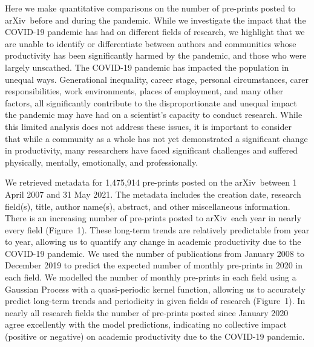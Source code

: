 \documentclass[a4paper,12pt]{article}
\newcommand{\arxiv}{arXiv}
\begin{document}
Here we make quantitative comparisons on the number of pre-prints posted to \arxiv\ before and during the pandemic. While we investigate the impact that the COVID-19 pandemic has had on different fields of research, we highlight that we are unable to identify or differentiate between authors and communities whose productivity has been significantly harmed by the pandemic, and those who were largely unscathed. The COVID-19 pandemic has impacted the population in unequal ways\cite{Nicola:2020,Chu:2020,IbnMohammed:2021}. Generational inequality, career stage, personal circumstances, carer responsibilities, work environments, places of employment, and many other factors, all significantly contribute to the disproportionate and unequal impact the pandemic may have had on a scientist's capacity to conduct research. 
While this limited analysis does not address these issues, it is important to consider that while a community as a whole has not yet demonstrated a significant change in productivity, many researchers have faced significant challenges and suffered physically, mentally, emotionally, and professionally. 


We retrieved metadata for 1,475,914 pre-prints posted on the \arxiv\ between 1 April 2007 and 31 May 2021. The metadata includes the creation date, research field(s), title, author name(s), abstract, and other miscellaneous information\cite{Clement:2019}. There is an increasing number of pre-prints posted to \arxiv\ each year in nearly every field (Figure~1). These long-term trends are relatively predictable from year to year, allowing us to quantify any change in academic productivity due to the COVID-19 pandemic. We used the number of publications from January 2008 to December 2019 to predict the expected number of monthly pre-prints in 2020 in each field. We modelled the number of monthly pre-prints in each field using a Gaussian Process with a quasi-periodic kernel function\cite{Rasmussen:2006,Ambikasaran:2014}, allowing us to accurately predict long-term trends and periodicity in given fields of research (Figure~1). In nearly all research fields the number of pre-prints posted since January 2020 agree excellently with the model predictions, indicating no collective impact (positive or negative) on academic productivity due to the COVID-19 pandemic.
\end{document}

